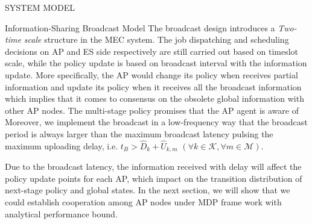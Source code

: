 \documentclass[10pt, conference, letterpaper]{IEEEtran}
\newcommand{\apSet}{\mathcal{K}}
\newcommand{\esSet}{\mathcal{M}}
\begin{document}
\begin{section}{SYSTEM MODEL}
\begin{subsection}{Information-Sharing Broadcast Model}
            The broadcast design introduces a \emph{Two-time scale} structure in the MEC system.
            The job dispatching and scheduling decisions on AP and ES side respectively are still carried out based on timeslot scale, while the policy update is based on broadcast interval with the information update.
            More specifically, the AP would change its policy when receives partial information and update its policy when it receives all the broadcast information which implies that it comes to consensus on the obsolete global information with other AP nodes.
            {\color{red}The multi-stage policy promises that the AP agent is aware of  Moreover, we implement the broadcast in a low-frequency way that the broadcast period is always larger than the maximum broadcast latency pulsing the maximum uploading delay, i.e. $t_B > \hat{D}_{k} + \hat{U}_{k,m}$ $(\forall k\in\apSet, \forall m\in\esSet)$.}

            Due to the broadcast latency, the information received with delay will affect the policy update points for each AP, which impact on the transition distribution of next-stage policy and global states.
            In the next section, we will show that we could establish cooperation among AP nodes under MDP frame work with analytical performance bound.
        \end{subsection}
    \end{section}
\end{document}
